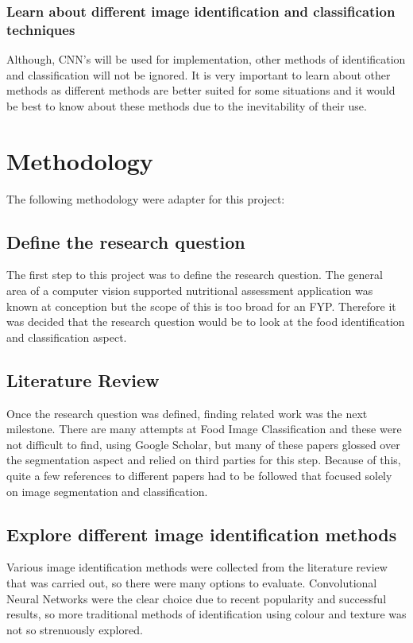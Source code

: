 \subsubsection*{Learn about different image identification and classification techniques}
Although, CNN's will be used for implementation, other methods of identification and classification will not be ignored.
It is very important to learn about other methods as different methods
are better suited for some situations and it would be best to know about these methods due to the inevitability of their use.

\section{Methodology}
The following methodology were adapter for this project:

\subsection*{Define the research question}
The first step to this project was to define the research question.
The general area of a computer vision supported nutritional assessment application was known at conception but the scope of this is too broad for an FYP.
Therefore it was decided that the research question would be to look at the food identification and classification aspect.

\subsection*{Literature Review}
Once the research question was defined, finding related work was the next milestone.
There are many attempts at Food Image Classification and these were not difficult to find, using Google Scholar, but many of these papers glossed over the segmentation aspect and relied on third parties for this step.
Because of this, quite a few references to different papers had to be followed that focused solely on image segmentation and classification.

\subsection*{Explore different image identification methods}
Various image identification methods were collected from the literature review
that was carried out, so there were many options to evaluate.
Convolutional Neural Networks were the clear choice due to recent popularity and successful results, so more traditional methods of identification using colour and texture was not so strenuously explored.

